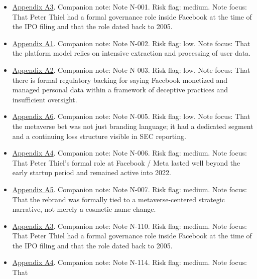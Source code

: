 \documentclass[
  american,
  11pt,
  letterpaper,
]{article}
\providecommand{\tightlist}{%
  \setlength{\itemsep}{0pt}\setlength{\parskip}{0pt}}
\begin{document}
\begin{itemize}
\tightlist
\item
  \hyperref[ch-01-appendix-a3-facebook-inc-registration-statement-on-form-s-1]{Appendix
  A3}. Companion note: Note N-001. Risk flag: medium. Note focus: That
  Peter Thiel had a formal governance role inside Facebook at the time
  of the IPO filing and that the role dated back to 2005.
\item
  \hyperref[ch-01-appendix-a1-a-look-behind-the-screens-examining-the-data-practices-of-social-media-and-video-streaming-services]{Appendix
  A1}. Companion note: Note N-002. Risk flag: low. Note focus: That the
  platform model relies on intensive extraction and processing of user
  data.
\item
  \hyperref[ch-01-appendix-a2-ftc-imposes-5-billion-penalty-and-sweeping-new-privacy-restrictions-on-facebook]{Appendix
  A2}. Companion note: Note N-003. Risk flag: low. Note focus: That
  there is formal regulatory backing for saying Facebook monetized and
  managed personal data within a framework of deceptive practices and
  insufficient oversight.
\item
  \hyperref[ch-01-appendix-a6-meta-platforms-inc-2023-annual-report-form-10-k]{Appendix
  A6}. Companion note: Note N-005. Risk flag: low. Note focus: That the
  metaverse bet was not just branding language; it had a dedicated
  segment and a continuing loss structure visible in SEC reporting.
\item
  \hyperref[ch-01-appendix-a4-meta-platforms-inc-2022-definitive-proxy-statement]{Appendix
  A4}. Companion note: Note N-006. Risk flag: medium. Note focus: That
  Peter Thiel's formal role at Facebook / Meta lasted well beyond the
  early startup period and remained active into 2022.
\item
  \hyperref[ch-01-appendix-a5-the-facebook-company-is-now-meta]{Appendix
  A5}. Companion note: Note N-007. Risk flag: medium. Note focus: That
  the rebrand was formally tied to a metaverse-centered strategic
  narrative, not merely a cosmetic name change.
\item
  \hyperref[ch-01-appendix-a3-facebook-inc-registration-statement-on-form-s-1]{Appendix
  A3}. Companion note: Note N-110. Risk flag: medium. Note focus: That
  Peter Thiel had a formal governance role inside Facebook at the time
  of the IPO filing and that the role dated back to 2005.
\item
  \hyperref[ch-01-appendix-a4-meta-platforms-inc-2022-definitive-proxy-statement]{Appendix
  A4}. Companion note: Note N-114. Risk flag: medium. Note focus: That

\end{itemize}
\end{document}
